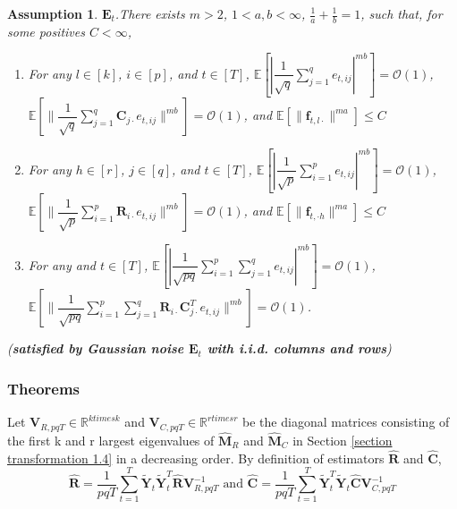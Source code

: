 \documentclass{article}[12pt]
\newtheorem{assumption}{Assumption}
\begin{document}
\begin{assumption}\label{assumption 5 1.7.1}
     $\mathbf{E}_t$.\normalfont  There exists $m>2$, $1<a,b<\infty$, $\frac{1}{a}+\frac{1}{b} = 1$, such that, for some positives $C<\infty$,
    \begin{enumerate}
        \item For any $l \in \left[k\right]$, $i \in \left[p\right]$, and $t \in \left[T\right]$, $\mathbb{E}\left[|\dfrac{1}{\sqrt{q}}\sum_{j=1}^{q}e_{t,ij}|^{mb}\right] = \mathcal{O}(1)$, $\mathbb{E}\left[\lVert\dfrac{1}{\sqrt{q}}\sum_{j=1}^{q}\mathbf{C}_{j\cdot}e_{t,ij}\rVert^{mb}\right] = \mathcal{O}(1)$, and $\mathbb{E}\left[\lVert\mathbf{f}_{t,l\cdot}\rVert^{ma}\right] \leq C$
        \item For any $h \in \left[r\right]$, $j \in \left[q\right]$, and $t \in \left[T\right]$, $\mathbb{E}\left[|\dfrac{1}{\sqrt{p}}\sum_{i=1}^{p}e_{t,ij}|^{mb}\right] = \mathcal{O}(1)$, $\mathbb{E}\left[\lVert\dfrac{1}{\sqrt{p}}\sum_{i=1}^{p}\mathbf{R}_{i\cdot}e_{t,ij}\rVert^{mb}\right] = \mathcal{O}(1)$, and $\mathbb{E}\left[\lVert\mathbf{f}_{t,\cdot h}\rVert^{ma}\right] \leq C$
        \item For any and $t \in \left[T\right]$, $\mathbb{E}\left[|\dfrac{1}{\sqrt{pq}}\sum_{i=1}^{p}\sum_{j=1}^qe_{t,ij}|^{mb}\right] = \mathcal{O}(1)$, $\mathbb{E}\left[\lVert\dfrac{1}{\sqrt{pq}}\sum_{i=1}^{p}\sum_{j=1}^q\mathbf{R}_{i\cdot}\mathbf{C}_{j\cdot}^Te_{t,ij}\rVert^{mb}\right] = \mathcal{O}(1)$.    
    \end{enumerate}
    
    (\textbf{\textit{satisfied by Gaussian noise $\mathbf{E}_t$ with i.i.d. columns and rows}})
\end{assumption}

\subsubsection{Theorems}
 Let $\mathbf{V}_{R,pqT} \in \mathbb{R}^{k times k}$ and $\mathbf{V}_{C,pqT} \in \mathbb{R}^{r times r}$ be the diagonal matrices consisting of the first k and r largest eigenvalues of $\mathbf{\widehat{M}}_R$ and $\mathbf{\widehat{M}}_C$ in Section \ref{section transformation 1.4} in a decreasing order. By definition of estimators $\mathbf{\widehat{R}}$ and $\mathbf{\widehat{C}}$,
 \begin{equation}
    \mathbf{\widehat{R}} = \dfrac{1}{pqT}\sum_{t=1}^T\mathbf{\widetilde{Y}}_t\mathbf{\widetilde{Y}}_t^T \mathbf{\widehat{R}} \mathbf{V}_{R,pqT}^{-1} \text{ and } \mathbf{\widehat{C}} = \dfrac{1}{pqT}\sum_{t=1}^T\mathbf{\widetilde{Y}}_t^T\mathbf{\widetilde{Y}}_t \mathbf{\widehat{C}} \mathbf{V}_{C,pqT}^{-1}
 \end{equation}
\end{document}
